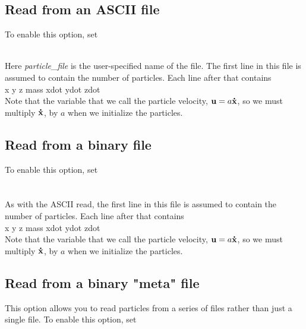 \subsection{Read from an ASCII file}

To enable this option, set \\

 \\

Here {\em particle\_file} is the user-specified name of the file.  The first line in this file is
assumed to contain the number of particles.  Each line after that contains  \\

x y z mass xdot ydot zdot \\

Note that the variable that we call the particle velocity, ${\mathbf u} = a {\bf \dot{x}}$, 
so we must multiply ${\bf \dot{x}}$, by $a$ when we initialize the particles.

\subsection{Read from a binary file}

To enable this option, set \\

 \\
 \\

As with the ASCII read, the first line in this file is
assumed to contain the number of particles.  Each line after that contains  \\

x y z mass xdot ydot zdot \\

Note that the variable that we call the particle velocity, ${\mathbf u} = a {\bf \dot{x}}$, 
so we must multiply ${\bf \dot{x}}$, by $a$ when we initialize the particles.

\subsection{Read from a binary "meta" file}

This option allows you to read particles from a series of files rather than 
just a single file.   To enable this option, set \\

